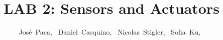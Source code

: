 \documentclass[journal]{IEEEtran}
\begin{document}
%
\title{LAB 2: Sensors and Actuators}
%
%
%

\author{José~Paca,~
  Daniel~Casquino,~
  Nicolas~Stigler,~
  Sofia~Ku,~%
}

% 
%

%
% 
\end{document}
